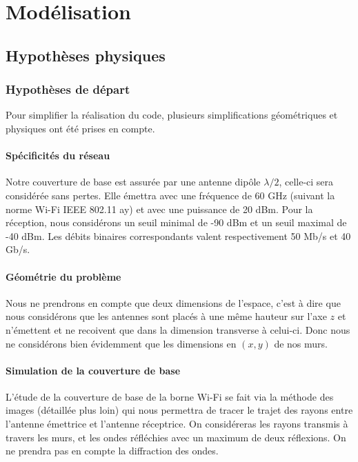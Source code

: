 \chapter{Modélisation}
\label{chapter-1}
\section{Hypothèses physiques}

\subsection{Hypoth{\`e}ses de d{\'e}part}

Pour simplifier la r{\'e}alisation du code, plusieurs simplifications
g{\'e}om{\'e}triques et physiques ont {\'e}t{\'e} prises en compte.

\subsubsection{Sp{\'e}cificit{\'e}s du r{\'e}seau}

Notre couverture de base est assur{\'e}e par une antenne dip{\^o}le $\lambda /
2$, celle-ci sera consid{\'e}r{\'e}e sans pertes. Elle {\'e}mettra avec une
fr{\'e}quence de 60 GHz (suivant la norme Wi-Fi IEEE 802.11 ay) et avec une
puissance de 20 dBm. Pour la r{\'e}ception, nous consid{\'e}rons un seuil
minimal de -90 dBm et un seuil maximal de -40 dBm. Les d{\'e}bits binaires
correspondants valent respectivement 50 Mb/s et 40 Gb/s.

\subsubsection{G{\'e}om{\'e}trie du probl{\`e}me}

Nous ne prendrons en compte que deux dimensions de l'espace, c'est {\`a} dire
que nous consid{\'e}rons que les antennes sont plac{\'e}s {\`a} une m{\^e}me
hauteur sur l'axe $z$ et n'{\'e}mettent et ne recoivent que dans la dimension
transverse {\`a} celui-ci. Donc nous ne consid{\'e}rons bien {\'e}videmment
que les dimensions en $(x, y)$ de nos murs.

\subsubsection{Simulation de la couverture de base}

L'{\'e}tude de la couverture de base de la borne Wi-Fi se fait via la
m{\'e}thode des images (d{\'e}taill{\'e}e plus loin) qui nous permettra de
tracer le trajet des rayons entre l'antenne {\'e}mettrice et l'antenne
r{\'e}ceptrice. On consid{\'e}reras les rayons transmis {\`a} travers les
murs, et les ondes r{\'e}fl{\'e}chies avec un maximum de deux r{\'e}flexions.
On ne prendra pas en compte la diffraction des ondes.

